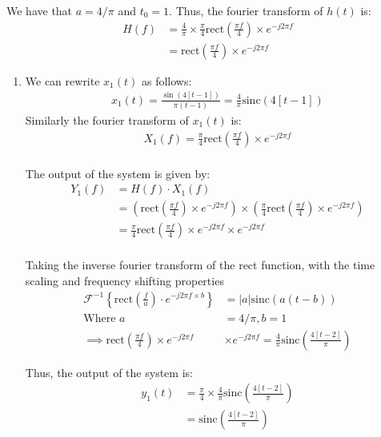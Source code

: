 \documentclass{article}
\begin{document}
We have that $a = 4/\pi$ and $t_0 = 1$. Thus, the fourier transform of $h(t)$ is:
\begin{align*}
    H(f) &= \frac{4}{\pi} \times \frac{\pi}{4} \text{rect}\left(\frac{\pi f}{4}\right) \times e^{-j2\pi f} \\
    &= \text{rect}\left(\frac{\pi f}{4}\right) \times e^{-j2\pi f}
\end{align*}


\begin{enumerate}[label=2.\arabic*]
    \item We can rewrite $x_1(t)$ as follows:
    \begin{align*}
        x_1(t) = \frac{\sin(4[t-1])}{\pi(t-1)} = \frac{4}{\pi} \text{sinc}(4[t-1])
    \end{align*}
    Similarly the fourier transform of $x_1(t)$ is:
    \begin{align*}
        X_1(f) = \frac{\pi}{4} \text{rect}\left(\frac{\pi f}{4}\right) \times e^{-j2\pi f} \\
    \end{align*}

    The output of the system is given by:
    \begin{align*}
        Y_1(f) &= H(f) \cdot X_1(f) \\
        &= \left(\text{rect}\left(\frac{\pi f}{4}\right) \times e^{-j2\pi f}\right) \times \left(\frac{\pi}{4} \text{rect}\left(\frac{\pi f}{4}\right) \times e^{-j2\pi f}\right) \\
        &= \frac{\pi}{4} \text{rect}\left(\frac{\pi f}{4}\right) \times e^{-j2\pi f} \times e^{-j2\pi f} \\
    \end{align*}

    Taking the inverse fourier transform of the rect function, with the time scaling and frequency shifting properties
    \begin{align*}
        \mathcal{F}^{-1}\left\{\text{rect}\left(\frac{f}{a}\right) \cdot e^{-j2\pi f \times b}\right\} &= |a| \text{sinc}(a(t-b)) \\
        \text{Where } a &= 4/\pi, b = 1 \\
        \implies \text{rect}\left(\frac{\pi f}{4}\right) \times e^{-j2\pi f} &\times e^{-j2\pi f} = \frac{4}{\pi} \text{sinc}\left(\frac{4[t-2]}{\pi}\right)
    \end{align*}

    Thus, the output of the system is:
    \begin{align*}
        y_1(t) &= \frac{\pi}{4} \times \frac{4}{\pi} \text{sinc}\left(\frac{4[t-2]}{\pi}\right) \\
        &= \boxed{\text{sinc}\left(\frac{4[t-2]}{\pi}\right)}
    \end{align*}


\end{enumerate}
\end{document}
